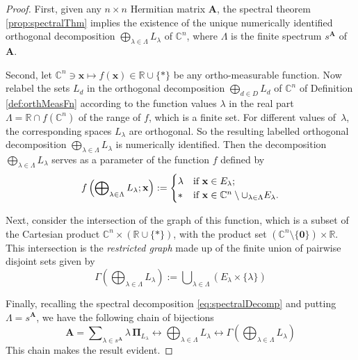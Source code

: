 \documentclass[11pt]{article}
\newcommand \R { \mathbb{R} }
\newcommand \C { \mathbb{C} }
\begin{document}
\begin{proof}
	First, given any $n \times n$ Hermitian matrix $ \mathbf A$, 
	the spectral theorem \ref{prop:spectralThm} implies the existence 
	of the unique numerically identified orthogonal decomposition 
	 \( \bigoplus\nolimits _{ \lambda \in \Lambda } L_\lambda \) of $ \C^n $,
	 where $ \Lambda $ is the finite spectrum $ s^{ \mathbf A}$ of $ \mathbf A$. 

	Second, let \( \C^n \owns \mathbf x \mapsto f( \mathbf x) \in \R \cup \{*\} \) 
	be any ortho-measurable function.
	Now relabel the sets $ L_d $ 
	in the orthogonal decomposition $ \bigoplus _{d \in D} L_d $ of $ \C^n $ 
	of Definition \ref{def:orthMeasFn} according to the function values $ \lambda $
	in the real part $ \Lambda = \R \cap f( \C^n )$ of the range of $f$, which is a finite set.
	For different values of~$ \lambda $, the corresponding spaces $ L_\lambda $ are orthogonal.
	So the resulting 
	labelled orthogonal decomposition $ \bigoplus _{ \lambda \in \Lambda } L_\lambda $
	is numerically identified.
	Then the decomposition $ \bigoplus _{ \lambda \in \Lambda } L_\lambda $ serves 
	as a parameter of the function $f$ defined by 
\begin{equation} \label{eq:defOMeasFn}
	f \left( \bigoplus\nolimits _{ \lambda \in \Lambda } L_\lambda ; \mathbf x \right) 
	:= \begin{cases} 
	\lambda & \text{if $ \mathbf x \in E_\lambda $}; \\
 	* & \text{if $ \mathbf x \in \C^n \setminus \cup _{ \lambda \in \Lambda } E_\lambda $}.
\end{cases}
\end{equation}
	
	Next, consider the intersection of the graph of this function, 
	which is a subset of the Cartesian product $ \C^n \times ( \R \cup \{*\} )$, 
	with the product set $( \C^n \setminus \{ \mathbf 0\} ) \times \R$. 
	This intersection is the \emph{restricted graph} made up of the finite union 
	of pairwise disjoint sets given by
\begin{equation} \label{eq:graphOMeasFn}
	\Gamma \left( \bigoplus\nolimits _{ \lambda \in \Lambda } L_\lambda \right) 
	:= \bigcup\nolimits _{ \lambda \in \Lambda } \left( E_\lambda \times \{ \lambda \} \right)
\end{equation}
	
	Finally, recalling the spectral decomposition \eqref{eq:spectralDecomp} 
	and putting $ \Lambda = s^{ \mathbf A} $, we have the following chain of bijections
\begin{equation} \label{eq:bijections}
	\mathbf A = \sum\nolimits _{ \lambda \in s^{ \mathbf A} } 
	\lambda \, \boldsymbol \Pi _{ L_\lambda } 
	\longleftrightarrow \bigoplus\nolimits _{ \lambda \in \Lambda } L_\lambda 
	\longleftrightarrow \Gamma \left( \bigoplus\nolimits _{ \lambda \in \Lambda } L_\lambda \right)
\end{equation}
	This chain makes the result evident.
\end{proof}
\end{document}
